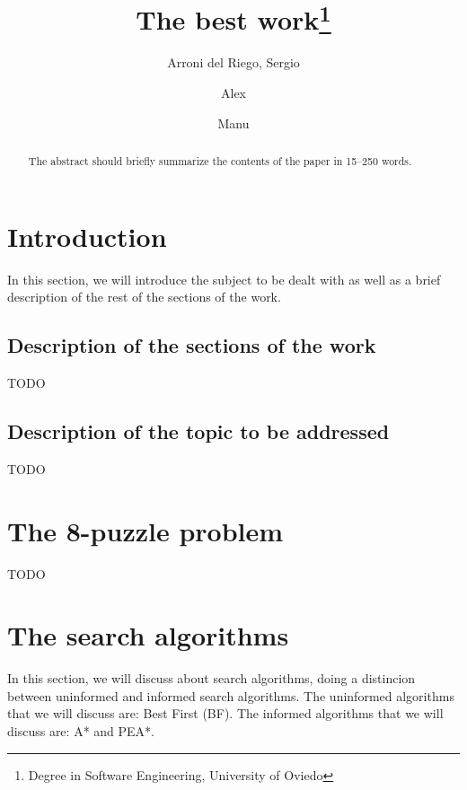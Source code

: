 \documentclass[runningheads]{llncs}
\begin{document}
%
\title{The best work\thanks{Degree in Software Engineering, University of Oviedo}}
%
%
\author{Arroni del Riego, Sergio \and
Alex \and
Manu}
%
%
%
\maketitle              %
%
\begin{abstract}
The abstract should briefly summarize the contents of the paper in
15--250 words.

\end{abstract}
%
%
%
\section{Introduction}
In this section, we will introduce the subject to be dealt with as well 
as a brief description of the rest of the sections of the work.

\subsection{Description of the sections of the work}
TODO

\subsection{Description of the topic to be addressed}
TODO

\section{The 8-puzzle problem}
TODO

\section{The search algorithms}
In this section, we will discuss about search algorithms, doing a distincion between uninformed and informed search algorithms.
The uninformed algorithms that we will discuss are: Best First (BF).
The informed algorithms that we will discuss are: A* and PEA*.
\end{document}
